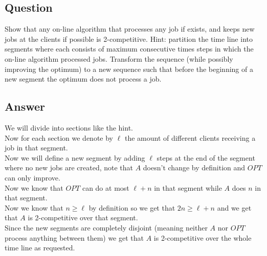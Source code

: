 \subsection*{Question}
Show that any on-line algorithm that processes any job if exists, and keeps new jobs at the clients if possible is 2-competitive. Hint: partition the time line into segments where each consists of maximum consecutive times steps in which the on-line algorithm processed jobs. Transform the sequence (while possibly improving the optimum) to a new sequence such that before the beginning of a new segment the optimum does not process a job.
\subsection*{Answer}
We will divide into sections like the hint.\\
Now for each section we denote by $\ell$ the amount of different clients receiving a job in that segment.\\
Now we will define a new segment by adding $\ell$ steps at the end of the segment where no new jobs are created, note that $A$ doesn't change by definition and $OPT$ can only improve.\\
Now we know that $OPT$ can do at most $\ell + n$ in that segment while $A$ does $n$ in that segment.\\
Now we know that $n\geq \ell$ by definition so we get that $2n \geq \ell + n$ and we get that $A$ is 2-competitive over that segment.\\
Since the new segments are completely disjoint (meaning neither $A$ nor $OPT$ process anything between them) we get that $A$ is 2-competitive over the whole time line as requested.